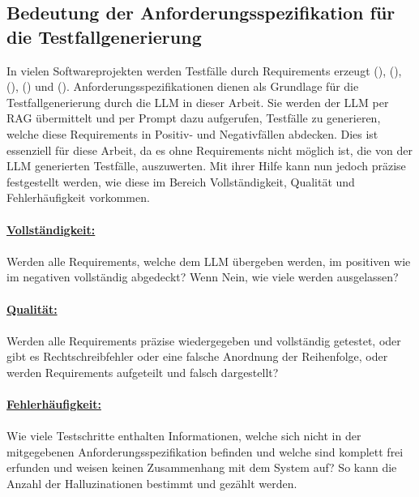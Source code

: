 \documentclass[12pt,toc=bib,toc=listof]{scrreprt}
\begin{document}
\subsection{Bedeutung der Anforderungsspezifikation für die Testfallgenerierung} %
\label{sec:bedeutungDerAnforderungsspezifikationFürDieTestfallgenerierung}
In vielen Softwareprojekten werden Testfälle durch Requirements erzeugt (\cite{Aysolmaz2018}), (\cite{Barmi2011}), (\cite{JamaSoftware2024}), (\cite{Mustafa2021}) und (\cite{Visure2024}). Anforderungsspezifikationen dienen als Grundlage für die Testfallgenerierung durch die LLM in dieser Arbeit. Sie werden der LLM per RAG übermittelt und per Prompt dazu aufgerufen, Testfälle zu generieren, welche diese Requirements in Positiv- und Negativfällen abdecken. Dies ist essenziell für diese Arbeit, da es ohne Requirements nicht möglich ist, die von der LLM generierten Testfälle, auszuwerten. Mit ihrer Hilfe kann nun jedoch präzise festgestellt werden, wie diese im Bereich Vollständigkeit, Qualität und Fehlerhäufigkeit vorkommen.\\
\\
\textbf{\underline{Vollständigkeit:}}\\
\\
Werden alle Requirements, welche dem LLM übergeben werden, im positiven wie im negativen vollständig abgedeckt? Wenn Nein, wie viele werden ausgelassen?\\
\\
\textbf{\underline{Qualität:}}\\
\\
Werden alle Requirements präzise wiedergegeben und vollständig getestet, oder gibt es Rechtschreibfehler oder eine falsche Anordnung der Reihenfolge, oder werden Requirements aufgeteilt und falsch dargestellt?\\
\\
\textbf{\underline{Fehlerhäufigkeit:}}\\
\\
Wie viele Testschritte enthalten Informationen, welche sich nicht in der mitgegebenen Anforderungsspezifikation befinden und welche sind komplett frei erfunden und weisen keinen Zusammenhang mit dem System auf? So kann die Anzahl der Halluzinationen bestimmt und gezählt werden.
\end{document}
